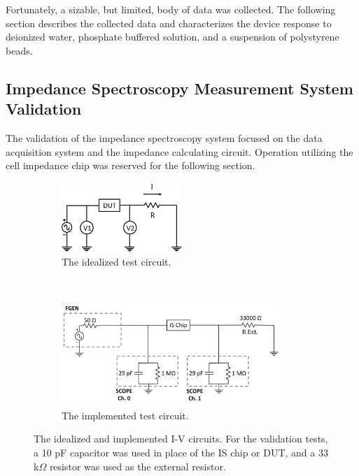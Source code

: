 \par Fortunately, a sizable, but limited, body of data was collected. The following section describes the collected data and characterizes the device response to deionized water, phosphate buffered solution, and a suspension of polystyrene beads.

\FloatBarrier


\clearpage

\subsection{Impedance Spectroscopy Measurement System Validation}

\par The validation of the impedance spectroscopy system focused on the data acquisition system and the impedance calculating circuit. Operation utilizing the cell impedance chip was reserved for the following section.

\begin{figure}[h]
\centering
    \begin{subfigure}[b]{\textwidth}
        \centering
        \includegraphics[width=0.5\textwidth]{images/I-VMethod.png}
        \caption{The idealized test circuit.}
        \label{fig:IS_DAQ_test_circuit_ideal}
    \end{subfigure}
    \\
    \vspace{0.1 in}
    \begin{subfigure}[b]{\textwidth}
        \centering
        \includegraphics[width=0.9\textwidth]{images/method_I-V.png}
        \caption{The implemented test circuit.}
        \label{fig:IS_DAQ_test_circuit_implemented}
    \end{subfigure}
    \caption{The idealized and implemented I-V circuits. For the validation tests, a 10 pF capacitor was used in place of the IS chip or DUT, and a 33 k$\Omega$ resistor was used as the external resistor.}
    \label{fig:IS_DAQ_test_circuit}
\end{figure}


